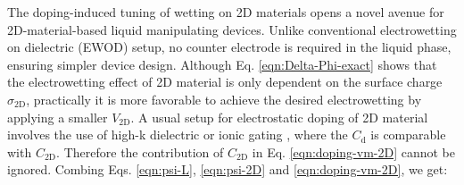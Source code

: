 \documentclass[aps,prl,reprint,groupedaddress,amsmath,amssymb, showpacs]{revtex4-1}
\begin{document}
The doping-induced tuning of wetting on 2D materials opens a novel
avenue for 2D-material-based liquid manipulating devices. Unlike
conventional electrowetting on dielectric (EWOD) setup, no counter
electrode is required in the liquid phase, ensuring simpler device
design. Although Eq. \ref{eqn:Delta-Phi-exact} shows that the
electrowetting effect of 2D material is only dependent on the surface
charge \(\sigma_{\mathrm{2D}}\), practically it is more favorable to
achieve the desired electrowetting by applying a smaller
\(V_{\mathrm{2D}}\). A usual setup for electrostatic doping of 2D
material involves the use of high-k dielectric or ionic gating
\cite{Das_2008,Radisavljevic_2011,Xu_2011,Newaz_2012}, where the
\(C_{\mathrm{d}}\) is comparable with \(C_{\mathrm{2D}}\). Therefore the
contribution of \(C_{\mathrm{2D}}\) in Eq. \ref{eqn:doping-vm-2D} cannot
be ignored. Combing Eqs. \ref{eqn:psi-L}, \ref{eqn:psi-2D} and
\ref{eqn:doping-vm-2D}, we get:
\end{document}
